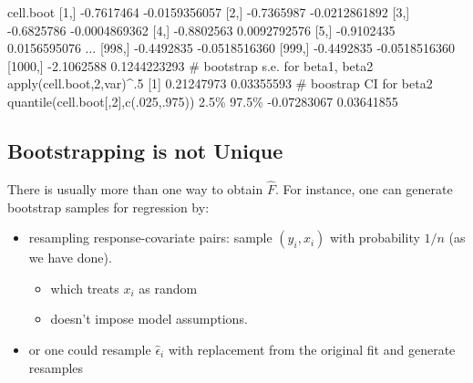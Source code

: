 \documentclass[
  letterpaper,
  DIV=11,
  numbers=noendperiod]{scrreport}
\newenvironment{Shaded}{\begin{snugshade}}{\end{snugshade}}
\newcommand{\CommentTok}[1]{\textcolor[rgb]{0.37,0.37,0.37}{#1}}
\newcommand{\DecValTok}[1]{\textcolor[rgb]{0.68,0.00,0.00}{#1}}
\newcommand{\FloatTok}[1]{\textcolor[rgb]{0.68,0.00,0.00}{#1}}
\newcommand{\FunctionTok}[1]{\textcolor[rgb]{0.28,0.35,0.67}{#1}}
\newcommand{\NormalTok}[1]{\textcolor[rgb]{0.00,0.23,0.31}{#1}}
\newcommand{\SpecialCharTok}[1]{\textcolor[rgb]{0.37,0.37,0.37}{#1}}
\providecommand{\tightlist}{%
  \setlength{\itemsep}{0pt}\setlength{\parskip}{0pt}}\usepackage{longtable,booktabs,array}
\begin{document}
\begin{Shaded}
\begin{Highlighting}[]
\NormalTok{cell.boot}
\NormalTok{  [}\DecValTok{1}\NormalTok{,] }\SpecialCharTok{{-}}\FloatTok{0.7617464} \SpecialCharTok{{-}}\FloatTok{0.0159356057}
\NormalTok{  [}\DecValTok{2}\NormalTok{,] }\SpecialCharTok{{-}}\FloatTok{0.7365987} \SpecialCharTok{{-}}\FloatTok{0.0212861892}
\NormalTok{  [}\DecValTok{3}\NormalTok{,] }\SpecialCharTok{{-}}\FloatTok{0.6825786} \SpecialCharTok{{-}}\FloatTok{0.0004869362}
\NormalTok{  [}\DecValTok{4}\NormalTok{,] }\SpecialCharTok{{-}}\FloatTok{0.8802563} \FloatTok{0.0092792576}
\NormalTok{  [}\DecValTok{5}\NormalTok{,] }\SpecialCharTok{{-}}\FloatTok{0.9102435} \FloatTok{0.0156595076}
\NormalTok{  ...}
\NormalTok{  [}\DecValTok{998}\NormalTok{,] }\SpecialCharTok{{-}}\FloatTok{0.4492835} \SpecialCharTok{{-}}\FloatTok{0.0518516360}
\NormalTok{  [}\DecValTok{999}\NormalTok{,] }\SpecialCharTok{{-}}\FloatTok{0.4492835} \SpecialCharTok{{-}}\FloatTok{0.0518516360}
\NormalTok{  [}\DecValTok{1000}\NormalTok{,] }\SpecialCharTok{{-}}\FloatTok{2.1062588} \FloatTok{0.1244223293}
\CommentTok{\# bootstrap s.e. for beta1, beta2}
\FunctionTok{apply}\NormalTok{(cell.boot,}\DecValTok{2}\NormalTok{,var)}\SpecialCharTok{\^{}}\NormalTok{.}\DecValTok{5}
\NormalTok{  [}\DecValTok{1}\NormalTok{] }\FloatTok{0.21247973} \FloatTok{0.03355593}
\CommentTok{\# boostrap CI for beta2}
\FunctionTok{quantile}\NormalTok{(cell.boot[,}\DecValTok{2}\NormalTok{],}\FunctionTok{c}\NormalTok{(.}\DecValTok{025}\NormalTok{,.}\DecValTok{975}\NormalTok{))}
  \FloatTok{2.5}\SpecialCharTok{\% 97.5\%}
  \SpecialCharTok{{-}}\FloatTok{0.07283067} \FloatTok{0.03641855}
\end{Highlighting}
\end{Shaded}

\hypertarget{bootstrapping-is-not-unique}{%
\subsection{Bootstrapping is not
Unique}\label{bootstrapping-is-not-unique}}

There is usually more than one way to obtain \(\hat F\). For instance,
one can generate bootstrap samples for regression by:

\begin{itemize}
\tightlist
\item
  resampling response-covariate pairs: sample \((y_i, x_i)\) with
  probability \(1/n\) (as we have done).

  \begin{itemize}
  \tightlist
  \item
    which treats \(x_i\) as random
  \item
    doesn't impose model assumptions.
  \end{itemize}
\item
  or one could resample \(\hat \epsilon_i\) with replacement from the
  original fit and generate resamples
\end{itemize}
\end{document}
